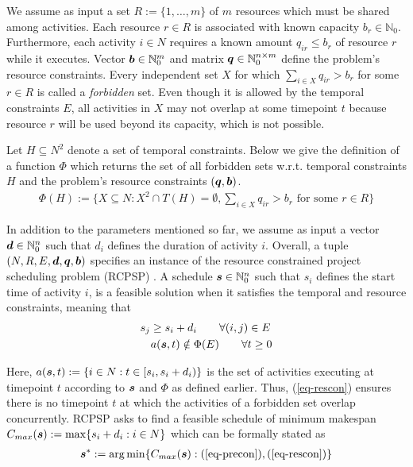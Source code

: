 	We assume as input a set $R := \{1,\ldots,m\}$ of $m$ resources which must be shared among activities.
	Each resource $r \in R$ is associated with known capacity $b_r \in \mathbb{N}_0$.
	Furthermore, each activity $i \in N$ requires a known amount 
	$q_{ir} \leq b_r$ of resource $r$ while it executes.
	Vector $\boldsymbol{b} \in \mathbb{N}^m_0$ and matrix $\boldsymbol{q} \in \mathbb{N}^{n \times m}_0$
	define the problem's resource constraints.
	Every independent set $X$ for which $\sum_{i\in X} q_{ir} > b_r$ 
	for some $r\in R$ is called a \emph{forbidden} set.
	Even though it is allowed by the temporal constraints $E$, 
	all activities in $X$ may not overlap at some timepoint $t$ because
	resource $r$ will be used beyond its capacity, which is not possible.
	
	Let $H \subseteq N^2$ denote a set of temporal constraints.
	Below we give the definition of a function $\Phi$ which returns the set of all forbidden sets
	w.r.t. temporal constraints $H$ and the problem's resource constraints $(\boldsymbol{q},\boldsymbol{b})$.
	\begin{align}
		\Phi(H) := \{X \subseteq N: 
		X^2 \cap T(H)=\emptyset, 
		\sum_{i\in X} q_{ir} > b_r \textrm{ for some } r \in R\}
	\end{align}
	
	In addition to the parameters mentioned so far,
	we assume as input a vector $\boldsymbol{d} \in \mathbb{N}^n_0$ such that $d_i$ defines the duration of activity $i$.
	Overall, a tuple $(N,R,E,\boldsymbol{d},\boldsymbol{q},\boldsymbol{b})$ specifies an instance of the 
	resource constrained project scheduling problem (RCPSP) \cite{}.
	A schedule $\boldsymbol{s} \in \mathbb{N}^n_0$ 
	such that $s_i$ defines the start time of activity $i$,
	is a feasible solution when it satisfies the temporal and resource constraints,
	meaning that
	\begin{align}
		s_j \geq s_i + d_i \qquad & \forall (i,j) \in E \label{eq-precon} \\
		a(\boldsymbol{s}, t) \notin \Phi(E)	\label{eq-rescon} & \qquad \forall t \geq 0
	\end{align}
 
	Here, $a(\boldsymbol{s},t) := \{i \in N : t \in [s_i, s_i+d_i)\}$ is the set of
	activities executing at timepoint $t$ according to $\boldsymbol{s}$ and $\Phi$ as defined earlier.
	Thus, (\ref{eq-rescon}) ensures there is no timepoint $t$ at which the
	activities of a forbidden set overlap concurrently.
	RCPSP asks to find a feasible schedule of minimum makespan
	$C_{max}(\boldsymbol{s}) := \max \{ s_i + d_i : i \in N\}$
	which can be formally stated as
	\begin{align}
		\boldsymbol{s}^* := \arg \min \{C_{max}(\boldsymbol{s}):  (\ref{eq-precon}), (\ref{eq-rescon}) \}
	\end{align}
	
